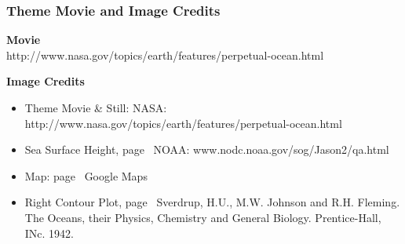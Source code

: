 \documentclass[xcolor=dvipsnames]{beamer}
\begin{document}
\begin{frame}
\frametitle{Theme Movie and Image Credits}

{\bf Movie}\\
http://www.nasa.gov/topics/earth/features/perpetual-ocean.html

\vspace{0.5in}

{\bf Image Credits}
\begin{itemize}
\item Theme Movie \& Still: NASA: {\tiny http://www.nasa.gov/topics/earth/features/perpetual-ocean.html}
\item Sea Surface Height, page~\pageref{ssh_image} NOAA: {\tiny www.nodc.noaa.gov/sog/Jason2/qa.html}
\item Map: page~\pageref{florida_straits_1} Google Maps
\item Right Contour Plot, page~\pageref{florida_straits_2} Sverdrup, H.U., M.W. Johnson and R.H. Fleming.  The Oceans, their Physics, Chemistry and General Biology. Prentice-Hall, INc. 1942. 
\end{itemize}

\end{frame}
\end{document}
